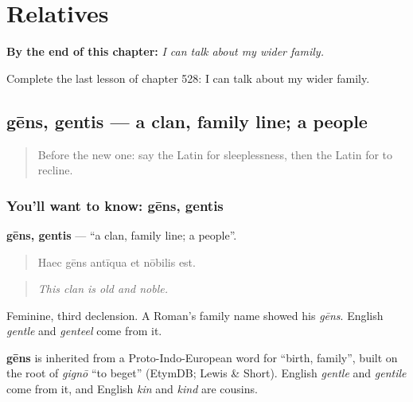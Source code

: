
\chapter{Relatives}
\label{ch:la-relatives}

\begin{chapteropening}
\textbf{By the end of this chapter:} \emph{I can talk about my wider family.}

Complete the last lesson of chapter 528: I can talk about my wider family.
\end{chapteropening}

\section[gēns, gentis]{gēns, gentis — a clan, family line; a people}

\label{lesson:LA-C528-gens}



\begin{quote}
Before the new one: say the Latin for sleeplessness, then the Latin for to recline.
\end{quote}

\subsection*{You'll want to know: gēns, gentis}
\textbf{gēns, gentis} — \textquotedblleft{}a clan, family line; a people\textquotedblright{}.

\begin{quote}
Haec gēns antīqua et nōbilis est.
\end{quote}

\begin{quote}
\emph{This clan is old and noble.}
\end{quote}

Feminine, third declension. A Roman's family name showed his \emph{gēns}. English \emph{gentle} and \emph{genteel} come from it.

\begin{cousinweb}
\textbf{gēns} is inherited from a Proto-Indo-European word for \textquotedblleft{}birth, family\textquotedblright{}, built on the root of \emph{gignō} \textquotedblleft{}to beget\textquotedblright{} (EtymDB; Lewis \& Short). English \emph{gentle} and \emph{gentile} come from it, and English \emph{kin} and \emph{kind} are cousins.
\end{cousinweb}

